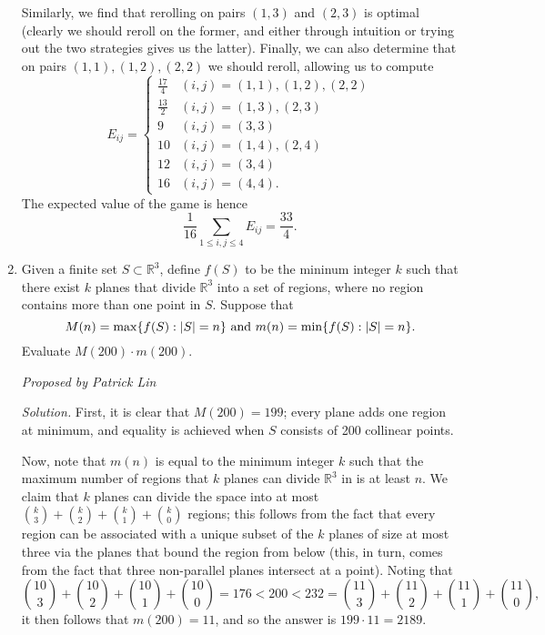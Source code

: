 \documentclass[10pt]{article}
\newcounter{enum}
\newcommand{\proposed}[1]
{
\vspace{5pt}
\noindent\textit{Proposed by #1}
}
\newcommand{\solution}
{
\vspace{5pt}
\noindent\textit{Solution.}\qquad
}
\DeclarePairedDelimiter\abs{\lvert}{\rvert}
\begin{document}
\begin{enumerate}
\par Similarly, we find that rerolling on pairs $(1,3)$ and $(2,3)$ is optimal (clearly we should reroll on the former, and either through intuition or trying out the two strategies gives us the latter). Finally, we can also determine that on pairs $(1,1),(1,2),(2,2)$ we should reroll, allowing us to compute
\[E_{ij} = 
\begin{cases}
\frac{17}{4} & (i,j) = (1,1),(1,2),(2,2) \\
\frac{13}{2} & (i,j) = (1,3),(2,3) \\
9 & (i,j) = (3,3) \\
10 & (i,j) = (1,4),(2,4) \\
12 & (i,j) = (3,4) \\
16 & (i,j) = (4,4).
\end{cases}\]
The expected value of the game is hence
\[\frac{1}{16} \sum_{1 \le i,j \le 4} E_{ij} = \boxed{\frac{33}{4}}.\]




\item Given a finite set $S \subset \mathbb{R}^3$, define $f(S)$ to be the mininum integer $k$ such that there exist $k$ planes that divide $\mathbb{R}^3$ into a set of regions, where no region contains more than one point in $S$. Suppose that
\[M(n) = \max\{f(S) : \abs{S} = n\} \text{ and } m(n) = \min\{f(S) : \abs{S} = n\}.\]
Evaluate $M(200) \cdot m(200)$.

\proposed{Patrick Lin}

\solution First, it is clear that $M(200) = 199$; every plane adds one region at minimum, and equality is achieved when $S$ consists of 200 collinear points.

\par Now, note that $m(n)$ is equal to the minimum integer $k$ such that the maximum number of regions that $k$ planes can divide $\mathbb{R}^3$ in is at least $n$. We claim that $k$ planes can divide the space into at most $\binom{k}{3} + \binom{k}{2} + \binom{k}{1} + \binom{k}{0}$ regions; this follows from the fact that every region can be associated with a unique subset of the $k$ planes of size at most three via the planes that bound the region from below (this, in turn, comes from the fact that three non-parallel planes intersect at a point). Noting that 
\[\binom{10}{3} + \binom{10}{2} + \binom{10}{1} + \binom{10}{0} = 176 < 200 < 232 = \binom{11}{3} + \binom{11}{2} + \binom{11}{1} + \binom{11}{0},\]
it then follows that $m(200) = 11$, and so the answer is $199\cdot11 = \boxed{2189}$.






\end{enumerate}
\end{document}

